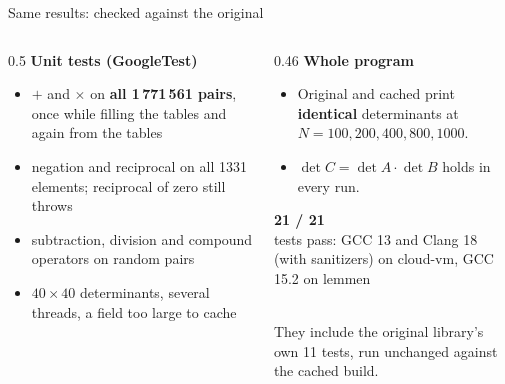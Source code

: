 \documentclass[aspectratio=169,11pt]{beamer}
\newcommand{\stat}[2]{%
  \begin{minipage}[t]{\linewidth}\centering
    {\Huge\bfseries\color{accent}#1}\\[0.3em]
    {\small\color{muted}#2}
  \end{minipage}}
\begin{document}
\begin{frame}{Same results: checked against the original}
  \begin{columns}[T]
    \begin{column}{0.5\textwidth}
      \textbf{Unit tests (GoogleTest)}
      \begin{itemize}\small
        \item $+$ and $\times$ on \textbf{all 1\,771\,561 pairs}, once while filling
              the tables and again from the tables
        \item negation and reciprocal on all 1331 elements;
              reciprocal of zero still throws
        \item subtraction, division and compound operators on random pairs
        \item $40\times40$ determinants, several threads, a field too large to cache
      \end{itemize}
    \end{column}
    \begin{column}{0.46\textwidth}
      \textbf{Whole program}
      \begin{itemize}\small
        \item Original and cached print \textbf{identical} determinants
              at $N = 100, 200, 400, 800, 1000$.
        \item $\det C = \det A\cdot\det B$ holds in every run.
      \end{itemize}
      \vspace{0.5em}
      \stat{21 / 21}{tests pass: GCC 13 and Clang 18 (with sanitizers) on cloud-vm,
                     GCC 15.2 on lemmen}
      \\[0.6em]
      {\footnotesize\color{muted}They include the original library's own 11 tests, run
       unchanged against the cached build.}
    \end{column}
  \end{columns}
\end{frame}
\end{document}

